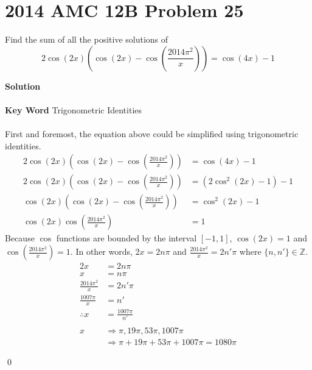 \documentclass{article}
\newenvironment{solution}{\begin{trivlist}\item[]{\bf Solution}}{\qed \end{trivlist}}
\begin{document}
\newpage
\section*{2014 AMC 12B Problem 25}
Find the sum of all the positive solutions of
\[
2 \cos (2x) \left( \cos (2x) - \cos \left(\frac{2014 \pi^2}{x} \right) \right) = \cos (4x) - 1
\]
\begin{solution}
\\\\
\textbf{Key Word} Trigonometric Identities
\\\\
First and foremost, the equation above could be simplified using trigonometric identities.
\begin{align*}
    2 \cos (2x) \left( \cos (2x) - \cos \left(\frac{2014 \pi^2}{x} \right) \right) &= \cos (4x) - 1 \\[0.4em]
    2 \cos (2x) \left( \cos (2x) - \cos \left(\frac{2014 \pi^2}{x} \right) \right) &= (2\cos^2(2x) - 1) - 1 \\[0.4em]
    \cos (2x) \left( \cos (2x) - \cos \left(\frac{2014 \pi^2}{x} \right) \right) &= \cos^2(2x) - 1 \\[0.4em]
    \cos (2x) \cos \left(\frac{2014 \pi^2}{x} \right) &= 1
\end{align*}
Because $\cos$ functions are bounded by the interval $[-1,1]$, $\cos (2x) = 1$ and $\cos \left(\frac{2014 \pi^2}{x} \right) = 1$. In other words, $2x = 2n\pi$ and $\frac{2014 \pi^2}{x} = 2n'\pi$ where $\{ n, n' \} \in \mathbb{Z}$.
\begin{align*}
    2x &= 2n\pi \\
    x &= n\pi \\
    \frac{2014 \pi^2}{x} &= 2n'\pi \\
    \frac{1007 \pi}{x} &= n' \\
    \therefore x &= \frac{1007 \pi}{n'}
    \\\\
    x
    &\Rightarrow \pi, 19\pi, 53\pi, 1007\pi \\
    &\Rightarrow \pi + 19\pi + 53\pi + 1007\pi = \boxed{1080\pi}
\end{align*}

\end{solution}
\end{document}
